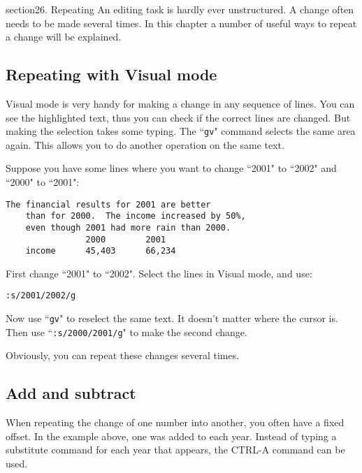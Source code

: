 section{26. Repeating}
An editing task is hardly ever unstructured.
A change often needs to be made several times.
In this chapter a number of useful ways to repeat a change will be explained.
\localtableofcontents
\subsection{Repeating with Visual mode}
Visual mode is very handy for making a change in any sequence of lines.
You can see the highlighted text, thus you can check if the correct lines are changed.
But making the selection takes some typing.
The ``\texttt{gv}" command selects the same area again.
This allows you to do another operation on the same text.

Suppose you have some lines where you want to change ``2001" to ``2002" and ``2000" to ``2001":

\begin{Verbatim}[samepage=true]
    The financial results for 2001 are better
    than for 2000.  The income increased by 50%,
    even though 2001 had more rain than 2000.
                2000        2001
    income      45,403      66,234
\end{Verbatim}

First change ``2001" to ``2002".  Select the lines in Visual mode, and use:

\begin{Verbatim}[samepage=true]
 :s/2001/2002/g
\end{Verbatim}

Now use ``\texttt{gv}" to reselect the same text.
It doesn't matter where the cursor is.
Then use ``\texttt{:s/2000/2001/g}" to make the second change.

Obviously, you can repeat these changes several times.
\subsection{Add and subtract}
When repeating the change of one number into another, you often have a fixed offset.
In the example above, one was added to each year.
Instead of typing a substitute command for each year that appears, the CTRL-A command can be used.

